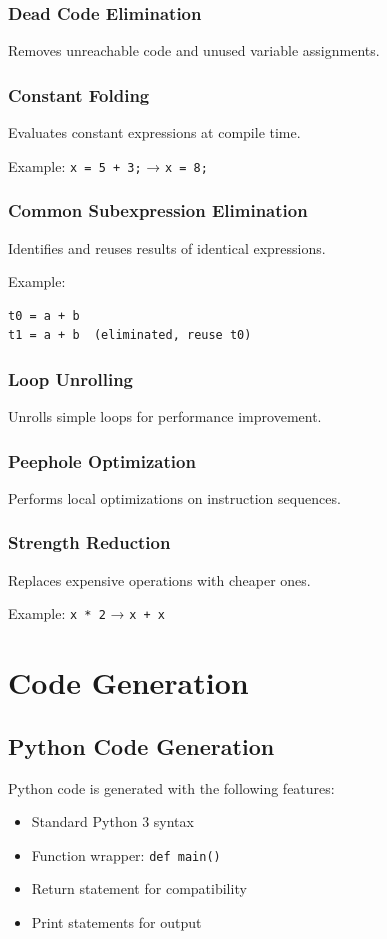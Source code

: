 \documentclass[12pt,a4paper]{report}
\begin{document}
\subsection{Dead Code Elimination}
Removes unreachable code and unused variable assignments.

\subsection{Constant Folding}
Evaluates constant expressions at compile time.

Example: \texttt{x = 5 + 3;} → \texttt{x = 8;}

\subsection{Common Subexpression Elimination}
Identifies and reuses results of identical expressions.

Example:
\begin{verbatim}
t0 = a + b
t1 = a + b  (eliminated, reuse t0)
\end{verbatim}

\subsection{Loop Unrolling}
Unrolls simple loops for performance improvement.

\subsection{Peephole Optimization}
Performs local optimizations on instruction sequences.

\subsection{Strength Reduction}
Replaces expensive operations with cheaper ones.

Example: \texttt{x * 2} → \texttt{x + x}

\chapter{Code Generation}

\section{Python Code Generation}

Python code is generated with the following features:
\begin{itemize}
    \item Standard Python 3 syntax
    \item Function wrapper: \texttt{def main()}
    \item Return statement for compatibility
    \item Print statements for output
\end{itemize}
\end{document}

